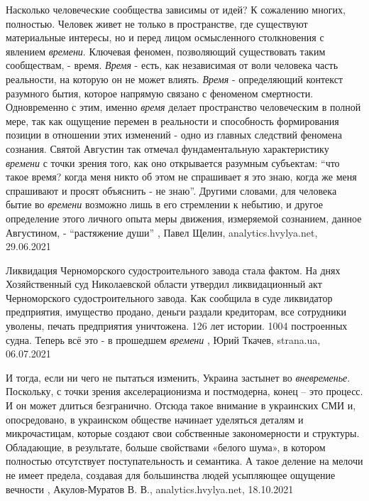 Насколько человеческие сообщества зависимы от идей? К сожалению многих,
полностью. Человек живет не только в пространстве, где существуют материальные
интересы, но и перед лицом осмысленного столкновения с явлением \emph{времени}.
Ключевая феномен, позволяющий существовать таким сообществам, - время. \emph{Время} -
есть, как независимая от воли человека часть реальности, на которую он не может
влиять. \emph{Время} - определяющий контекст разумного бытия, которое напрямую связано
с феноменом смертности. Одновременно с этим, именно \emph{время} делает пространство
человеческим в полной мере, так как ощущение перемен в реальности и способность
формирования позиции в отношении этих изменений - одно из главных следствий
феномена сознания. Святой Августин так отмечал фундаментальную характеристику
\emph{времени} с точки зрения того, как оно открывается разумным субъектам: \enquote{что такое
время? когда меня никто об этом не спрашивает я это знаю, когда же меня
спрашивают и просят объяснить - не знаю}. Другими словами, для человека бытие
во \emph{времени} возможно лишь в его стремлении к небытию, и другое определение этого
личного опыта меры движения, измеряемой сознанием, данное Августином, -
\enquote{растяжение души}
, Павел Щелин, 
analytics.hvylya.net, 29.06.2021

Ликвидация Черноморского судостроительного завода стала фактом.  На днях
Хозяйственный суд Николаевской области утвердил ликвидационный акт
Черноморского судостроительного завода.  Как сообщила в суде ликвидатор
предприятия, имущество продано, деньги раздали кредиторам, все сотрудники
уволены, печать предприятия уничтожена.  126 лет истории. 1004 построенных
судна. Теперь всё это - в прошедшем \emph{времени}
, 
Юрий Ткачев, strana.ua, 06.07.2021

И тогда, если ни чего не пытаться изменить, Украина застынет во \emph{вневременье}.
Поскольку, с точки зрения акселерационизма и постмодерна, конец – это процесс.
И он может длиться безгранично. Отсюда такое внимание в украинских СМИ и,
опосредовано, в украинском обществе начинает уделяться деталям и микрочастицам,
которые создают свои собственные закономерности и структуры. Обладающие, в
результате, больше свойствами «белого шума», в котором полностью отсутствует
поступательность и семантика. А такое деление на мелочи не имеет предела,
создавая для большинства людей усыпляющее ощущение вечности
, 
Акулов-Муратов В. В., analytics.hvylya.net, 18.10.2021

